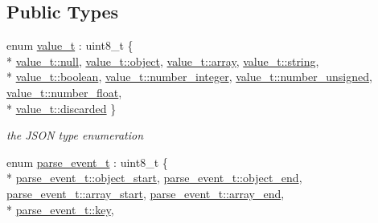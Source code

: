 \subsection*{Public Types}
\begin{DoxyCompactItemize}
\item 
enum \hyperlink{a00025_a231b02148577b69a154b2ce2c87a5522}{value\+\_\+t} \+: uint8\+\_\+t \{ \\*
\hyperlink{a00025_a231b02148577b69a154b2ce2c87a5522a37a6259cc0c1dae299a7866489dff0bd}{value\+\_\+t\+::null}, 
\hyperlink{a00025_a231b02148577b69a154b2ce2c87a5522aa8cfde6331bd59eb2ac96f8911c4b666}{value\+\_\+t\+::object}, 
\hyperlink{a00025_a231b02148577b69a154b2ce2c87a5522af1f713c9e000f5d3f280adbd124df4f5}{value\+\_\+t\+::array}, 
\hyperlink{a00025_a231b02148577b69a154b2ce2c87a5522ab45cffe084dd3d20d928bee85e7b0f21}{value\+\_\+t\+::string}, 
\\*
\hyperlink{a00025_a231b02148577b69a154b2ce2c87a5522a84e2c64f38f78ba3ea5c905ab5a2da27}{value\+\_\+t\+::boolean}, 
\hyperlink{a00025_a231b02148577b69a154b2ce2c87a5522a5763da164f8659d94a56e29df64b4bcc}{value\+\_\+t\+::number\+\_\+integer}, 
\hyperlink{a00025_a231b02148577b69a154b2ce2c87a5522adce7cc8ec29055c4158828921f2f265e}{value\+\_\+t\+::number\+\_\+unsigned}, 
\hyperlink{a00025_a231b02148577b69a154b2ce2c87a5522ad9966ecb59667235a57b4b999a649eef}{value\+\_\+t\+::number\+\_\+float}, 
\\*
\hyperlink{a00025_a231b02148577b69a154b2ce2c87a5522a94708897ec9db8647dfe695714c98e46}{value\+\_\+t\+::discarded}
 \}\begin{DoxyCompactList}\small\item\em the J\+S\+ON type enumeration \end{DoxyCompactList}
\item 
enum \hyperlink{a00025_aea1c863b719b4ca5b77188c171bbfafe}{parse\+\_\+event\+\_\+t} \+: uint8\+\_\+t \{ \\*
\hyperlink{a00025_aea1c863b719b4ca5b77188c171bbfafeae73f17027cb0acbb537f29d0a6944b26}{parse\+\_\+event\+\_\+t\+::object\+\_\+start}, 
\hyperlink{a00025_aea1c863b719b4ca5b77188c171bbfafeaf63e2a2468a37aa4f394fcc3bcb8249c}{parse\+\_\+event\+\_\+t\+::object\+\_\+end}, 
\hyperlink{a00025_aea1c863b719b4ca5b77188c171bbfafeaa4388a3d92419edbb1c6efd4d52461f3}{parse\+\_\+event\+\_\+t\+::array\+\_\+start}, 
\hyperlink{a00025_aea1c863b719b4ca5b77188c171bbfafea49642fb732aa2e112188fba1f9d3ef7f}{parse\+\_\+event\+\_\+t\+::array\+\_\+end}, 
\\*
\hyperlink{a00025_aea1c863b719b4ca5b77188c171bbfafea3c6e0b8a9c15224a8228b9a98ca1531d}{parse\+\_\+event\+\_\+t\+::key}, 

\end{DoxyCompactItemize}
